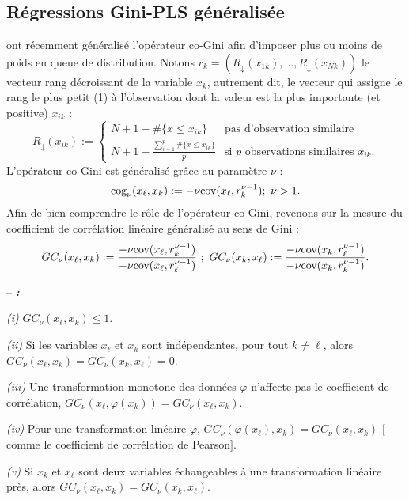 \subsection{Régressions Gini-PLS généralisée} 

\citet{Schechtman03} ont récemment généralisé l'opérateur co-Gini afin d'imposer plus ou moins de poids en queue de distribution. Notons $r_{k}=(R_\downarrow(x_{1k}),\ldots, R_\downarrow(x_{Nk}))$ le vecteur rang décroissant de la variable $x_k$, autrement dit, le vecteur qui assigne le rang le plus petit (1) à l'observation dont la valeur est la plus importante (et positive) $x_{ik}$ :
\[
R_\downarrow(x_{ik}) :=
\left\{ \begin{array}{ll}
N+1- \#\{x \leq x_{ik} \} & \text{pas d'observation similaire} \\
N+1-\frac{\sum_{i=1}^p \#\{ x \leq x_{ik}  \}}{p} & \text{si $p$ observations similaires $x_{ik}$.}
\end{array}
\right.
\]
L'opérateur co-Gini est généralisé grâce au paramètre $\nu$ :
\begin{equation}\label{cogg}
\text{cog}_\nu(x_\ell,x_k) := -\nu \text{cov}(x_\ell,r_{k}^{\nu-1}) ;  \ \nu > 1.
\end{equation}
Afin de bien comprendre le rôle de l'opérateur co-Gini, revenons sur la mesure du coefficient de corrélation linéaire généralisé au sens de Gini :
\[
GC_\nu(x_\ell,x_k) := \frac{-\nu \text{cov}(x_\ell,r_{k}^{\nu-1})}{-\nu \text{cov}(x_\ell,r_{\ell}^{\nu-1})} \ ; \ GC_\nu(x_k,x_\ell) := \frac{-\nu \text{cov}(x_k,r_{\ell}^{\nu-1})}{-\nu \text{cov}(x_k,r_{k}^{\nu-1})}.
\]

\begin{property}\label{prop1} -- \textbf{\emph{\citet{Schechtman03}:}}
	
	\noindent \emph{(i)} $GC_\nu(x_\ell,x_k) \leq 1$.
	
	\noindent\emph{(ii)} Si les variables $x_\ell$ et $x_k$ sont indépendantes, pour tout $k\neq \ell$, alors $GC_\nu(x_\ell,x_k) = GC_\nu(x_k,x_\ell) =0$.
	
	\noindent\emph{(iii)} Une transformation monotone des données $\varphi$ n'affecte pas le coefficient de corrélation, $GC_\nu(x_\ell,\varphi(x_k)) = GC_\nu(x_\ell,x_k)$.
	
	\noindent\emph{(iv)} Pour une transformation linéaire $\varphi$, $GC_\nu(\varphi(x_\ell),x_k) = GC_\nu(x_\ell,x_k)$ $[$comme le coefficient de corrélation de Pearson$]$.
	
	\noindent\emph{(v)} Si $x_k$ et $x_\ell$ sont deux variables échangeables à une transformation linéaire près, alors $GC_\nu(x_\ell,x_k) = GC_\nu(x_k,x_\ell)$.
\end{property}

